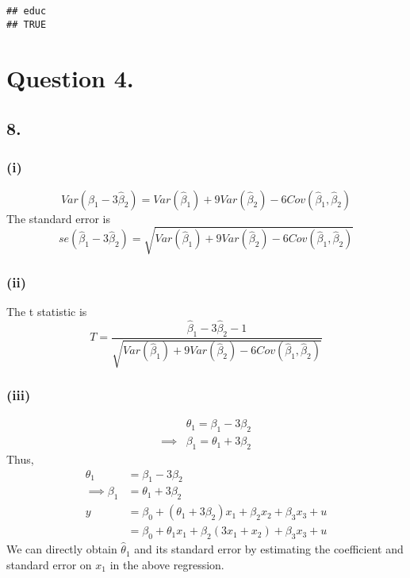 \documentclass[
]{article}
\begin{document}
\begin{verbatim}
## educ 
## TRUE
\end{verbatim}

\hypertarget{question-4.}{%
\section{Question 4.}\label{question-4.}}

\hypertarget{section-2}{%
\subsection{8.}\label{section-2}}

\hypertarget{i-1}{%
\subsubsection{(i)}\label{i-1}}

\[Var(\hat\beta_1 - 3 \hat\beta_2) = Var(\hat\beta_1) + 9 Var(\hat\beta_2) -6Cov(\hat\beta_1, \hat\beta_2)\]
The standard error is
\[se(\hat\beta_1 - 3 \hat\beta_2) = \sqrt{Var(\hat\beta_1) + 9 Var(\hat\beta_2) -6Cov(\hat\beta_1, \hat\beta_2)}\]

\hypertarget{ii-1}{%
\subsubsection{(ii)}\label{ii-1}}

The t statistic is
\[T = \frac{\hat\beta_1 - 3 \hat\beta_2 - 1}{\sqrt{Var(\hat\beta_1) + 9 Var(\hat\beta_2) -6Cov(\hat\beta_1, \hat\beta_2)}}\]

\hypertarget{iii-1}{%
\subsubsection{(iii)}\label{iii-1}}

\[\begin{aligned}
&\theta_1 = \beta_1 - 3 \beta_2 \\
\implies& \beta_1 = \theta_1 + 3 \beta_2
\end{aligned}\] Thus, \[\begin{aligned}
\theta_1 &= \beta_1 - 3 \beta_2 \\
\implies \beta_1 &= \theta_1 + 3 \beta_2 \\
y &= \beta_0 + (\theta_1 + 3\beta_2)x_1 + \beta_2 x_2 + \beta_3 x_3 + u \\
&= \beta_0 + \theta_1x_1 + \beta_2 (3x_1 +x_2) + \beta_3 x_3 + u 
\end{aligned}\] We can directly obtain \(\hat\theta_1\) and its standard
error by estimating the coefficient and standard error on \(x_1\) in the
above regression.
\end{document}
